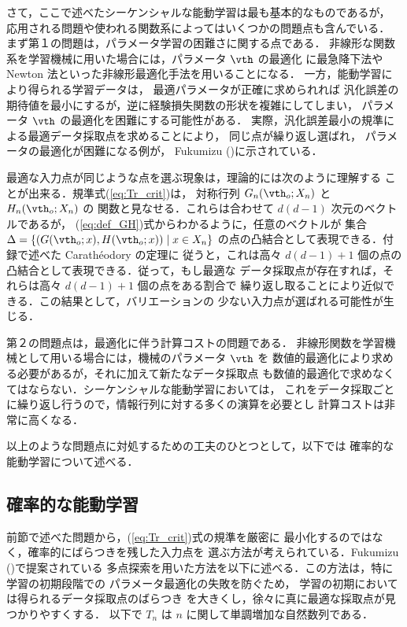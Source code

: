 \documentclass[master]{cimt}
\begin{document}



さて，ここで述べたシーケンシャルな能動学習は最も基本的なものであるが，
応用される問題や使われる関数系によってはいくつかの問題点も含んでいる．
まず第１の問題は，パラメータ学習の困難さに関する点である．
非線形な関数系を学習機械に用いた場合には，パラメータ $\vth$ の最適化
に最急降下法や Newton 法といった非線形最適化手法を用いることになる．
一方，能動学習により得られる学習データは，
最適パラメータが正確に求められれば
汎化誤差の期待値を最小にするが，逆に経験損失関数の形状を複雑にしてしまい，
パラメータ $\vth$ の最適化を困難にする可能性がある．
実際，汎化誤差最小の規準による最適データ採取点を求めることにより，
同じ点が繰り返し選ばれ，
パラメータの最適化が困難になる例が，
Fukumizu (\cite{fuku_al_ieee})に示されている．

最適な入力点が同じような点を選ぶ現象は，理論的には次のように理解する
ことが出来る．規準式(\ref{eq:Tr_crit})は，
対称行列 $G_n(\vth_o; X_n)$ と $H_n(\vth_o; X_n)$ の
関数と見なせる．これらは合わせて $d(d-1)$ 次元のベクトルであるが，
(\ref{eq:def_GH})式からわかるように，任意のベクトルが
集合 $\Delta = \{ (G(\vth_o; x), H(\vth_o; x)) \mid x \in X_n \}$ 
の点の凸結合として表現できる．付録で述べた Carath\'{e}odory の定理に
従うと，これは高々 $d(d-1)+1$ 
個の点の凸結合として表現できる．従って，もし最適な
データ採取点が存在すれば，それらは高々 $d(d-1)+1$ 個の点をある割合で
繰り返し取ることにより近似できる．この結果として，バリエーションの
少ない入力点が選ばれる可能性が生じる．

第２の問題点は，最適化に伴う計算コストの問題である．
非線形関数を学習機械として用いる場合には，機械のパラメータ $\vth$ を
数値的最適化により求める必要があるが，それに加えて新たなデータ採取点
も数値的最適化で求めなくてはならない．シーケンシャルな能動学習においては，
これをデータ採取ごとに繰り返し行うので，情報行列に対する多くの演算を必要とし
計算コストは非常に高くなる．

以上のような問題点に対処するための工夫のひとつとして，以下では
確率的な能動学習について述べる．


\subsection{確率的な能動学習}
\label{sec:prob_al}
前節で述べた問題から，(\ref{eq:Tr_crit})式の規準を厳密に
最小化するのではなく，確率的にばらつきを残した入力点を
選ぶ方法が考えられている．Fukumizu (\cite{fuku_al_ieee})で提案されている
多点探索を用いた方法を以下に述べる．この方法は，特に学習の初期段階での
パラメータ最適化の失敗を防ぐため，
学習の初期においては得られるデータ採取点のばらつき
を大きくし，徐々に真に最適な採取点が見つかりやすくする．
以下で $T_n$ は $n$ に関して単調増加な自然数列である．
\end{document}
